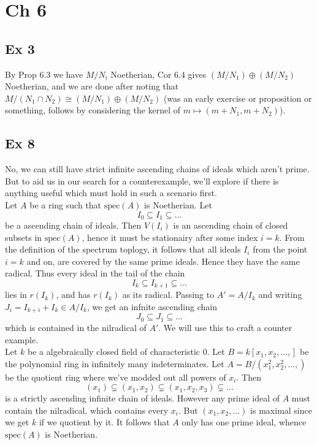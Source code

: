 \documentclass{article}
\theoremstyle{definition}
\newcommand{\spec}{\text{spec}}
\begin{document}
\section*{Ch 6}


\subsection*{Ex 3}

By Prop 6.3 we have $M / N_i$ Noetherian, Cor 6.4 gives $(M / N_1) \oplus (M /
N_2)$ Noetherian, and we are done after noting that $M/(N_1 \cap N_2) \cong (M
/ N_1) \oplus (M / N_2)$ (was an early exercise or proposition or something,
follows by considering the kernel of $m \mapsto (m + N_1, m + N_2)$). 

\subsection*{Ex 8}

No, we can still have strict infinite ascending chains of ideals which aren't
prime. But to aid us in our search for a counterexample, we'll explore if there
is anything useful which must hold in such a scenario first. \\

Let $A$ be a ring such that $\spec(A)$ is Noetherian. Let 
\[
	I_0 \subseteq I_1 \subseteq \ldots
\] 
be a ascending chain of ideals. Then $V(I_i)$ is an ascending chain of closed
subsets in $\spec(A)$, hence it must be stationairy after some index $i = k$.
From the definition of the spectrum toplogy, it follows that all ideals $I_i$
from the point $i = k$ and on, are covered by the same prime ideals. Hence
they have the same radical. Thus every ideal in the tail of the chain 
\[
	I_k \subseteq I_{k + 1} \subseteq \ldots
\] 
lies in $r(I_k)$, and has $r(I_k)$ as its radical. Passing to $A' = A/I_k$ and
writing $J_i = I_{k + i} + I_k \in A / I_k$, we get an infnite ascending chain
\[
	J_0 \subseteq J_1 \subseteq \ldots
\] 
which is contained in the nilradical of $A'$. We will use this to craft a
counter example. \\

Let $k$ be a algebraically closed field of characteristic $0$. Let $B = k[x_1,
x_2, \ldots, ]$ be the polynomial ring in infinitely many indeterminates. Let
$A = B / (x_1^{2}, x_2^{2}, \ldots, )$ be the quotient ring where we've modded
out all powers of $x_i$. Then
\[
	(x_1) \subsetneq (x_1, x_2) \subsetneq (x_1, x_2, x_3) \subsetneq \ldots
\] 
is a strictly ascending infinite chain of ideals. However any prime ideal of
$A$ must contain the nilradical, which contains every $x_i$. But $(x_1, x_2,
\ldots)$ is maximal since we get $k$ if we quotient by it. It follows that $A$
only has one prime ideal, whence $\spec(A)$ is Noetherian. 
\end{document}
